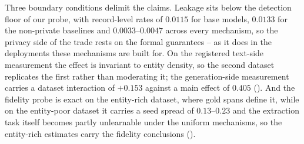 Three boundary conditions delimit the claims.
Leakage sits below the detection floor of our probe,
with record-level rates of $0.0115$ for base models,
$0.0133$ for the non-private baselines and $0.0033$--$0.0047$ across every mechanism,
so the privacy side of the trade rests on the formal guarantees -- as it does in the deployments these mechanisms are built for.
On the registered text-side measurement the effect is invariant to entity density,
so the second dataset replicates the first rather than moderating it;
the generation-side measurement carries a dataset interaction of $+0.153$ against a main effect of $0.405$ ().
And the fidelity probe is exact on the entity-rich dataset,
where gold spans define it,
while on the entity-poor dataset it carries a seed spread of $0.13$--$0.23$ and the extraction task itself becomes partly unlearnable under the uniform mechanisms,
so the entity-rich estimates carry the fidelity conclusions ().
